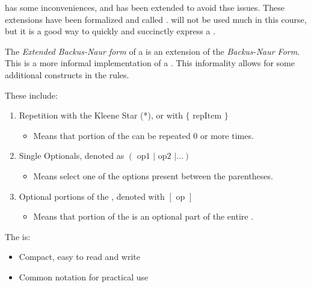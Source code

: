  has some inconveniences, and has been extended to avoid thse issues.
These extensions have been formalized and called .
 will not be used much in this course, but it is a good way to quickly and succinctly express a .

\begin{definition}\label{def:CFG_EBNF_Form}
  The \emph{Extended Backus-Naur form} of a  is an extension of the \emph{Backus-Naur Form}.
  This is a more informal implementation of a .
  This informality allows for some additional constructs in the  rules.

  These include:
  \begin{enumerate}[noitemsep]

  \item Repetition with the Kleene Star (*), or with $\lbrace \text{ repItem } \rbrace$
    \begin{itemize}[noitemsep]
    \item Means that portion of the  can be repeated 0 or more times.
    \end{itemize}
  \item Single Optionals, denoted as $(\text{ op1 } \vert \text{ op2 } \vert \ldots)$
    \begin{itemize}[noitemsep]
    \item Means select one of the options present between the parentheses.
    \end{itemize}
  \item Optional portions of the , denoted with $[\text{ op }]$
    \begin{itemize}[noitemsep]
    \item Means that portion of the  is an optional part of the entire .
    \end{itemize}
  \end{enumerate}

  The  is:
  \begin{itemize}[noitemsep]
  \item Compact, easy to read and write
  \item Common notation for practical use
  \end{itemize}
\end{definition}

